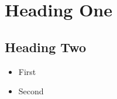 \documentclass{article}
\begin{document}
\section{Heading One}
\subsection{Heading Two}
\begin{itemize}
  \item First
  \item Second
\end{itemize}
\end{document}
